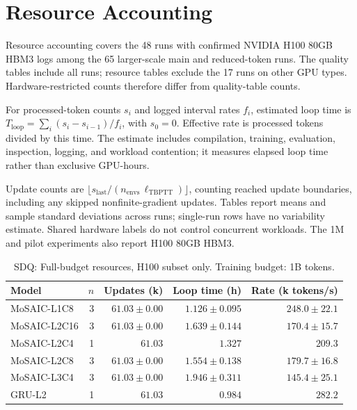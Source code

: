\section{Resource Accounting}\label{app:resources}

Resource accounting covers the 48 runs with confirmed NVIDIA H100 80GB HBM3 logs among the 65 larger-scale main and reduced-token runs. The quality tables include all runs; resource tables exclude the 17 runs on other GPU types. Hardware-restricted counts therefore differ from quality-table counts.

For processed-token counts $s_i$ and logged interval rates $f_i$, estimated loop time is $T_{\mathrm{loop}}=\sum_i(s_i-s_{i-1})/f_i$, with $s_0=0$. Effective rate is processed tokens divided by this time. The estimate includes compilation, training, evaluation, inspection, logging, and workload contention; it measures elapsed loop time rather than exclusive GPU-hours.

Update counts are $\lfloor s_{\mathrm{last}}/(n_{\mathrm{envs}}\,\ell_{\mathrm{TBPTT}})\rfloor$, counting reached update boundaries, including any skipped nonfinite-gradient updates. Tables report means and sample standard deviations across runs; single-run rows have no variability estimate. Shared hardware labels do not control concurrent workloads. The 1M and pilot experiments also report H100 80GB HBM3.

\begin{table}[H]
\centering
\caption{SDQ: Full-budget resources, H100 subset only. Training budget: 1B tokens.}
\begin{tabular}{lrrrr}
\toprule
Model & $n$ & Updates (k) & Loop time (h) & Rate (k tokens/s) \\
\midrule
MoSAIC-L1C8 & 3 & $61.03\pm0.00$ & $1.126\pm0.095$ & $248.0\pm22.1$ \\
MoSAIC-L2C16 & 3 & $61.03\pm0.00$ & $1.639\pm0.144$ & $170.4\pm15.7$ \\
MoSAIC-L2C4 & 1 & $61.03$ & $1.327$ & $209.3$ \\
MoSAIC-L2C8 & 3 & $61.03\pm0.00$ & $1.554\pm0.138$ & $179.7\pm16.8$ \\
MoSAIC-L3C4 & 3 & $61.03\pm0.00$ & $1.946\pm0.311$ & $145.4\pm25.1$ \\
GRU-L2 & 1 & $61.03$ & $0.984$ & $282.2$ \\
\bottomrule
\end{tabular}
\end{table}

